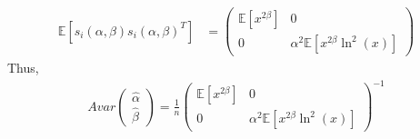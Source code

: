 \documentclass[a4paper]{article}
\newcommand{\expect}{\mathbb{E}}
\begin{document}
\begin{enumerate}[(a)]
\begin{align*}
	\expect[s_i(\alpha, \beta)s_i(\alpha, \beta)^T] &= \begin{pmatrix}
	\expect[x^{2\beta}] & 0\\
	0 & \alpha^2 \expect[x^{2\beta}\ln^2(x)]
	\end{pmatrix}
	\end{align*}
	Thus, 
	\begin{align*}
	Avar \begin{pmatrix}
	\hat{\alpha}\\
	\hat{\beta}
	\end{pmatrix} = \frac{1}{n}\begin{pmatrix}
	\expect[x^{2\beta}] & 0\\
	0 & \alpha^2 \expect[x^{2\beta}\ln^2(x)]
	\end{pmatrix}^{-1}
	\end{align*}
\end{enumerate}
\end{document}
